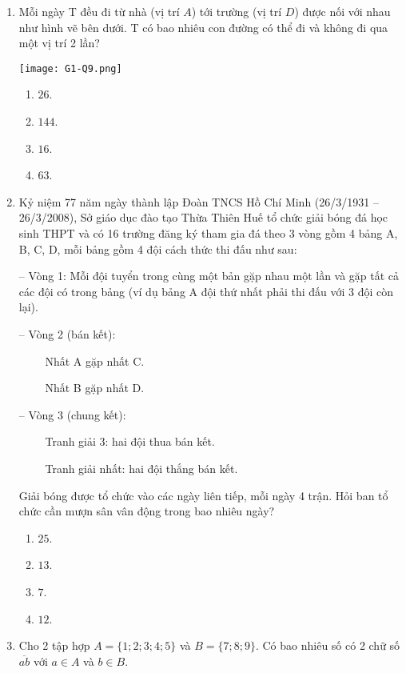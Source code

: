 \begin{enumerate}[label=\textbf{Câu \arabic*.},align=left,left=0cm..0cm,itemindent=*]
	\item Mỗi ngày T đều đi từ nhà (vị trí $A$) tới trường (vị trí $D$) được nối với nhau như hình vẽ bên dưới. T có bao nhiêu con đường có thể đi và không đi qua một vị trí 2 lần?\par {\centering\texttt{[image: G1-Q9.png]}\par}
	\begin{enumerate}[label=\textbf{\Alph*.},align=left,left=1cm..0cm,itemindent=*]
		\item $26$. \item $144$. \item $16$. \item $63$.
	\end{enumerate}
	\item Kỷ niệm 77 năm ngày thành lập Đoàn TNCS Hồ Chí Minh (26/3/1931 – 26/3/2008), Sở giáo dục đào tạo Thừa Thiên Huế tổ chức giải bóng đá học sinh THPT và có 16 trường đăng ký tham gia đá theo 3 vòng gồm 4 bảng A, B, C, D, mỗi bảng gồm 4 đội cách thức thi đấu như sau:\par
	– Vòng 1: Mỗi đội tuyển trong cùng một bản gặp nhau một lần và gặp tất cả các đội có trong bảng (ví dụ bảng A đội thứ nhất phải thi đấu với 3 đội còn lại).\par
	– Vòng 2 (bán kết):\par
	~~~~ Nhất A gặp nhất C.\par
	~~~~ Nhất B gặp nhất D.\par
	– Vòng 3 (chung kết):\par
	~~~~ Tranh giải 3: hai đội thua bán kết.\par
	~~~~ Tranh giải nhất: hai đội thắng bán kết.\par
	Giải bóng được tổ chức vào các ngày liên tiếp, mỗi ngày 4 trận. Hỏi ban tổ chức cần mượn sân vân động trong bao nhiêu ngày?
	\begin{enumerate}[label=\textbf{\Alph*.},align=left,left=1cm..0cm,itemindent=*]
		\item $25$. \item $13$. \item $7$. \item $12$.
	\end{enumerate}
	\item Cho 2 tập hợp $A=\{1;2;3;4;5\}$ và $B=\{7;8;9\}$. Có bao nhiêu số có 2 chữ số $\overline{ab}$ với $a\in A$ và $b\in B$.
	\begin{enumerate}[label=\textbf{\Alph*.},align=left,left=1cm..0cm,itemindent=*]

\end{enumerate}
\end{enumerate}

